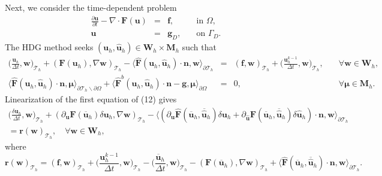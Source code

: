 \documentclass[11pt]{article}
\begin{document}
Next, we consider the time-dependent problem
\begin{equation}
\begin{array}{rcll}
\displaystyle \frac{\partial \bm{u}}{\partial t} - \nabla \cdot \bm{F} (\bm{u}) & = & \bm{f}, & \quad \mbox{in } \Omega, \\
\bm{u} & = & \bm{g}_D, & \quad \mbox{on } \Gamma_D .
\end{array}
\end{equation}
The HDG method seeks $(\bm{u}_h, \widehat{\bm{u}}_h) \in \bm{W}_h \times \bm{M}_h$ such that
\begin{equation}
\begin{array}{rcll}
\displaystyle \Big(\frac{\bm{u}_h}{\Delta t}, \bm{w} \Big)_{\mathcal{T}_h} + (\bm{F} (\bm{u}_h), \nabla \bm{w})_{\mathcal{T}_h} - \langle \widehat{\bm{F}} (\bm{u}_h, \widehat{\bm{u}}_h) \cdot \bm{n}, \bm{w} \rangle_{\partial \mathcal{T}_h} & = & (\bm{f}, \bm{w})_{\mathcal{T}_h} + \displaystyle \Big(\frac{\bm{u}_h^{k-1}}{\Delta t}, \bm{w} \Big)_{\mathcal{T}_h}, & \quad \forall \bm{w} \in \bm{W}_h, \\[2ex]
\langle \widehat{\bm{F}} (\bm{u}_h, \widehat{\bm{u}}_h) \cdot \bm{n}, \bm{\mu} \rangle_{\partial \mathcal{T}_h \backslash \partial \Omega} + \langle \widehat{\bm{F}}^b(\bm{u}_h, \widehat{\bm{u}}_h) \cdot \bm{n} - \bm{g}, \bm{\mu} \rangle_{\partial \Omega}  & = & 0, & \quad \forall \bm{\mu} \in \bm{M}_h .
\end{array}
\end{equation}
Linearization of the first equation of (12) gives
\begin{multline}
\displaystyle \Big( \frac{\delta \bm{u}_h}{\Delta t}, \bm{w} \Big)_{\mathcal{T}_h}  + (\partial_{\bm{u}} \bm{F} (\overline{\bm{u}}_h) \delta \bm{u}_h, \nabla \bm{w})_{\mathcal{T}_h} - \langle (\partial_{\bm{u}} \widehat{\bm{F}} (\overline{\bm{u}}_h, \overline{\widehat{\bm{u}}}_h) \delta \bm{u}_h + \partial_{\widehat{\bm{u}}} \widehat{\bm{F}} (\overline{\bm{u}}_h, \overline{\widehat{\bm{u}}}_h) \delta \widehat{\bm{u}}_h) \cdot \bm{n}, \bm{w} \rangle_{\partial \mathcal{T}_h}\\  =  \bm{r}(\bm{w})_{\mathcal{T}_h},  \quad \forall \bm{w} \in \bm{W}_h,
\end{multline}
where
\begin{equation}
\bm{r}(\bm{w})_{\mathcal{T}_h} = (\bm{f}, \bm{w})_{\mathcal{T}_h} + \displaystyle \Big(\frac{\bm{u}_h^{k-1}}{\Delta t}, \bm{w} \Big)_{\mathcal{T}_h} - \Big(\frac{\overline{\bm{u}}_h}{\Delta t}, \bm{w} \Big)_{\mathcal{T}_h} - (\bm{F} (\overline{\bm{u}}_h), \nabla \bm{w})_{\mathcal{T}_h} + \langle \widehat{\bm{F}} (\overline{\bm{u}}_h, \overline{\widehat{\bm{u}}}_h) \cdot \bm{n}, \bm{w} \rangle_{\partial \mathcal{T}_h} .
\end{equation}
\end{document}
